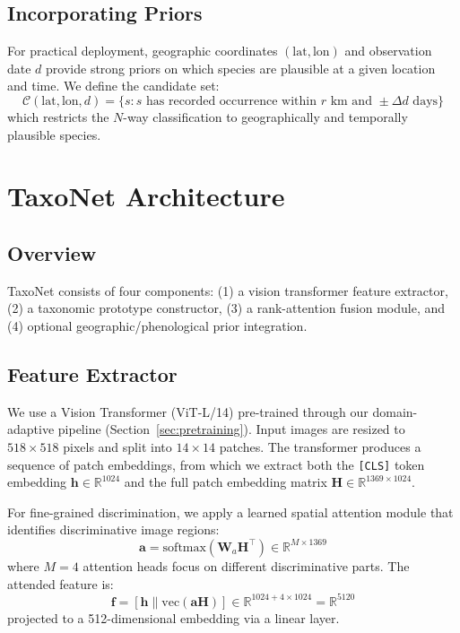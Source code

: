 \documentclass[11pt,a4paper]{article}
\newcommand{\R}{\mathbb{R}}
\begin{document}
\subsection{Incorporating Priors}

For practical deployment, geographic coordinates $(\text{lat},
\text{lon})$ and observation date $d$ provide strong priors on which
species are plausible at a given location and time. We define the
candidate set:
\begin{equation}
  \mathcal{C}(\text{lat}, \text{lon}, d) = \{s : s \text{ has recorded
    occurrence within } r \text{ km and } \pm \Delta d \text{ days}\}
\end{equation}
which restricts the $N$-way classification to geographically and
temporally plausible species.


\section{TaxoNet Architecture}
\label{sec:architecture}

\subsection{Overview}

TaxoNet consists of four components: (1) a vision transformer feature
extractor, (2) a taxonomic prototype constructor, (3) a rank-attention
fusion module, and (4) optional geographic/phenological prior
integration.

\subsection{Feature Extractor}

We use a Vision Transformer (ViT-L/14) pre-trained through our
domain-adaptive pipeline (Section~\ref{sec:pretraining}). Input images
are resized to $518 \times 518$ pixels and split into $14 \times 14$
patches. The transformer produces a sequence of patch embeddings, from
which we extract both the \texttt{[CLS]} token embedding $\mathbf{h}
\in \R^{1024}$ and the full patch embedding matrix $\mathbf{H} \in
\R^{1369 \times 1024}$.

For fine-grained discrimination, we apply a learned spatial attention
module that identifies discriminative image regions:
\begin{equation}
  \mathbf{a} = \text{softmax}(\mathbf{W}_a \mathbf{H}^\top) \in
  \R^{M \times 1369}
\end{equation}
where $M = 4$ attention heads focus on different discriminative parts.
The attended feature is:
\begin{equation}
  \mathbf{f} = [\mathbf{h} \| \text{vec}(\mathbf{a} \mathbf{H})]
  \in \R^{1024 + 4 \times 1024} = \R^{5120}
\end{equation}
projected to a 512-dimensional embedding via a linear layer.
\end{document}
